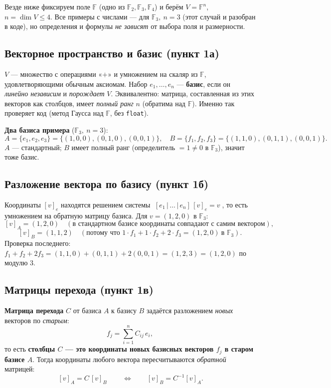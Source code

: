 \documentclass[11pt]{article}
\newcommand{\F}{\mathbb{F}}
\begin{document}
Везде ниже фиксируем поле $\F$ (одно из $\F_2,\F_3,\F_4$) и берём
$V=\F^{n}$, $n=\dim V\le 4$. Все примеры с числами — для $\F_3,\ n=3$ (этот случай и
разобран в коде), но определения и формулы \emph{не зависят} от выбора поля и размерности.

\subsection{Векторное пространство и базис (пункт 1а)}

$V$ — множество с операциями «$+$» и умножением на скаляр из $\F$, удовлетворяющими
обычным аксиомам. Набор $e_1,\dots,e_n$ — \textbf{базис}, если он
\emph{линейно независим} и \emph{порождает} $V$. Эквивалентно: матрица, составленная из
этих векторов как столбцов, имеет \emph{полный ранг} $n$ (обратима над $\F$). Именно так
проверяет код (метод Гаусса над $\F$, без \texttt{float}).

\textbf{Два базиса примера} ($\F_3,\ n=3$):
\[
A=\{e_1,e_2,e_3\}=\Big\{(1,0,0),(0,1,0),(0,0,1)\Big\},\quad
B=\{f_1,f_2,f_3\}=\Big\{(1,1,0),(0,1,1),(0,0,1)\Big\}.
\]
$A$ — стандартный; $B$ имеет полный ранг (определитель $=1\neq 0$ в $\F_3$), значит тоже
базис.

\subsection{Разложение вектора по базису (пункт 1б)}

Координаты $[v]_e$ находятся решением системы $\;[e_1\,|\,\dots\,|\,e_n]\,[v]_e=v\;$, то
есть умножением на обратную матрицу базиса. Для $v=(1,2,0)$ в $\F_3$:
\[
[v]_A=(1,2,0)\quad(\text{в стандартном базисе координаты совпадают с самим вектором}),
\]
\[
[v]_B=(1,1,2)\quad(\text{потому что } 1\!\cdot\!f_1+1\!\cdot\!f_2+2\!\cdot\!f_3=(1,2,0)\ \text{в }\F_3).
\]
Проверка последнего: $f_1+f_2+2f_3=(1,1,0)+(0,1,1)+2(0,0,1)=(1,2,3)=(1,2,0)$ по модулю $3$.

\subsection{Матрицы перехода (пункт 1в)}
\label{ssec:trans}

\begin{idea}
\textbf{Матрица перехода} $C$ от базиса $A$ к базису $B$ задаётся разложением
\emph{новых} векторов по \emph{старым}:
\[
  f_j=\sum_{i=1}^{n} C_{ij}\,e_i,
\]
то есть \textbf{столбцы $C$ — это координаты новых базисных векторов $f_j$ в старом
базисе $A$}. Тогда координаты любого вектора пересчитываются \emph{обратной} матрицей:
\[
  \boxed{\,[v]_A=C\,[v]_B\,}\qquad\Longleftrightarrow\qquad [v]_B=C^{-1}[v]_A .
\]
\end{idea}
\end{document}
